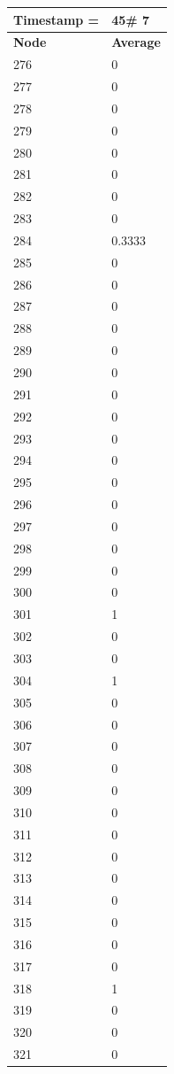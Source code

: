 \begin{tabular}{|l||l|}
\hline
\textbf{Timestamp =} & \textbf{45}\# 7\\\hline
	\textbf{Node} & \textbf{Average} \\ \hline
\hline
	276 & 0 \\ \hline
	277 & 0 \\ \hline
	278 & 0 \\ \hline
	279 & 0 \\ \hline
	280 & 0 \\ \hline
	281 & 0 \\ \hline
	282 & 0 \\ \hline
	283 & 0 \\ \hline
	284 & 0.3333 \\ \hline
	285 & 0 \\ \hline
	286 & 0 \\ \hline
	287 & 0 \\ \hline
	288 & 0 \\ \hline
	289 & 0 \\ \hline
	290 & 0 \\ \hline
	291 & 0 \\ \hline
	292 & 0 \\ \hline
	293 & 0 \\ \hline
	294 & 0 \\ \hline
	295 & 0 \\ \hline
	296 & 0 \\ \hline
	297 & 0 \\ \hline
	298 & 0 \\ \hline
	299 & 0 \\ \hline
	300 & 0 \\ \hline
	301 & 1 \\ \hline
	302 & 0 \\ \hline
	303 & 0 \\ \hline
	304 & 1 \\ \hline
	305 & 0 \\ \hline
	306 & 0 \\ \hline
	307 & 0 \\ \hline
	308 & 0 \\ \hline
	309 & 0 \\ \hline
	310 & 0 \\ \hline
	311 & 0 \\ \hline
	312 & 0 \\ \hline
	313 & 0 \\ \hline
	314 & 0 \\ \hline
	315 & 0 \\ \hline
	316 & 0 \\ \hline
	317 & 0 \\ \hline
	318 & 1 \\ \hline
	319 & 0 \\ \hline
	320 & 0 \\ \hline
	321 & 0 \\ \hline
\end{tabular}
